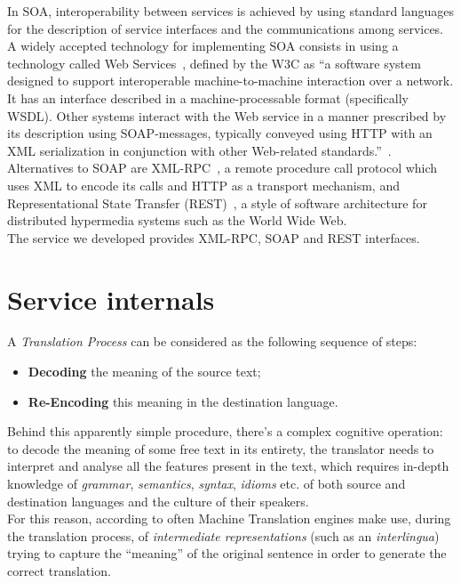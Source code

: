 \documentclass[11pt]{article}
\begin{document}
In SOA, interoperability between services is achieved by using standard languages for the description of service interfaces and the communications
among services. A widely accepted technology for implementing SOA consists in using a technology called Web Services~\citep{soa}, defined by the W3C as 
``a software system designed to support interoperable machine-to-machine interaction over a network. 
It has an interface described in a machine-processable format (specifically WSDL). 
Other systems interact with the Web service in a manner prescribed by its description using SOAP-messages, typically conveyed using HTTP with an 
XML serialization in conjunction with other Web-related standards.''~\citep{wsgloss}. 
Alternatives to SOAP are XML-RPC~\citep{xmlrpcspec}, a remote procedure call protocol which uses XML to encode its calls and HTTP as a transport 
mechanism, and Representational State Transfer (REST)~\citep{rest}, a style of software architecture for distributed hypermedia systems such as 
the World Wide Web.\\

The service we developed provides XML-RPC, SOAP and REST interfaces.


\section{Service internals}

A \emph{Translation Process} can be considered as the following sequence of steps:

\begin{itemize}
 \item {\bf Decoding} the meaning of the source text;
 \item {\bf Re-Encoding} this meaning in the destination language.
\end{itemize}

Behind this apparently simple procedure, there's a complex cognitive operation: to decode the meaning of some free text in its entirety, the translator
needs to interpret and analyse all the features present in the text, which requires in-depth knowledge of \emph{grammar}, \emph{semantics}, \emph{syntax},
\emph{idioms} etc. of both source and destination languages and the culture of their speakers.\\

For this reason, according to \citep{arnoldea} often Machine Translation engines make use, during the translation process, of \emph{intermediate representations} 
(such as an \emph{interlingua}) trying to capture the ``meaning'' of the original sentence in order to generate the  correct translation.
\end{document}
